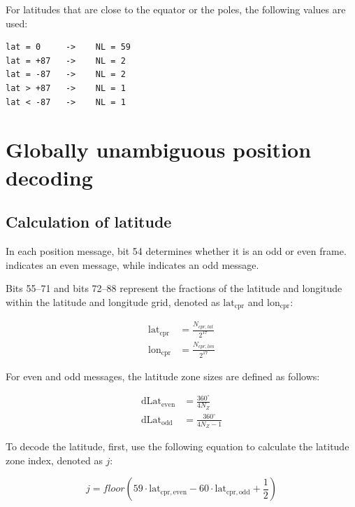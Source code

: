 For latitudes that are close to the equator or the poles, the following values are used:

\begin{verbatim}
lat = 0     ->    NL = 59
lat = +87   ->    NL = 2
lat = -87   ->    NL = 2
lat > +87   ->    NL = 1
lat < -87   ->    NL = 1
\end{verbatim}


\section{Globally unambiguous position decoding} 

\subsection{Calculation of latitude} \label{sec:cpr_airborne_global_lat}

In each position message, bit 54 determines whether it is an odd or even frame. \0 indicates an even message, while \1 indicates an odd message.

Bits 55--71 and bits 72--88 represent the fractions of the latitude and longitude within the latitude and longitude grid, denoted as $\mathrm{lat}_\mathrm{cpr}$ and $\mathrm{lon}_\mathrm{cpr}$:

\begin{equation}
  \begin{split}
      \mathrm{lat}_\mathrm{cpr} &= \frac{N_{cpr,lat}}{2^{17}} \\
    \mathrm{lon}_\mathrm{cpr} &= \frac{N_{cpr,lon}}{2^{17}}
  \end{split}
\end{equation}


For even and odd messages, the latitude zone sizes are defined as follows:

\begin{equation}
\begin{split}
  \mathrm{dLat}_\mathrm{even} &= \frac{360^\circ}{4 N_Z} \\
  \mathrm{dLat}_\mathrm{odd} &= \frac{360^\circ}{4 N_Z - 1}
\end{split}
\end{equation}


To decode the latitude, first, use the following equation to calculate the latitude zone index, denoted as $j$:

\begin{equation}
  j = floor \left( 59 \cdot \mathrm{lat}_\mathrm{cpr, even} - 60 \cdot \mathrm{lat}_\mathrm{cpr,odd} + \frac{1}{2}  \right)
\end{equation}



